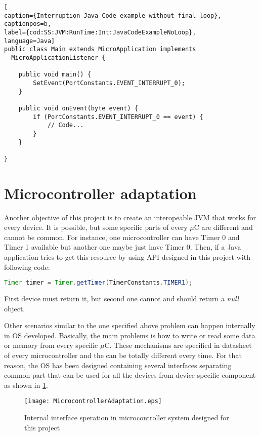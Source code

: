 \medskip
\begin{lstlisting}[
caption={Interruption Java Code example without final loop},
captionpos=b,
label={cod:SS:JVM:RunTime:Int:JavaCodeExampleNoLoop},
language=Java]
public class Main extends MicroApplication implements
  MicroApplicationListener {

    public void main() {
        SetEvent(PortConstants.EVENT_INTERRUPT_0);
    }

    public void onEvent(byte event) {
        if (PortConstants.EVENT_INTERRUPT_0 == event) {
            // Code...
        }
    }

}
\end{lstlisting}
\medskip

\section{Microcontroller adaptation}\label{SS:JVM:Micros}
Another objective of this project is to create an interopeable JVM that works for every device. It is possible, but some specific parts of every $\mu$C are different and cannot be common. For instance, one microcontroller can have Timer 0 and Timer 1 available but another one maybe just have Timer 0. Then, if a Java application tries to get this resource by using API designed in this project with following code:

\medskip
\begin{lstlisting}[language=Java]
Timer timer = Timer.getTimer(TimerConstants.TIMER1);
\end{lstlisting}
\medskip

First device must return it, but second one cannot and should return a \textit{null} object.

Other scenarios similar to the one specified above problem can happen internally in OS developed. Basically, the main problems is how to write or read some data or memory from every specific $\mu$C. These mechanisms are specified in datasheet of every microcontroller and the can be totally different every time. For that reason, the OS has been designed containing several interfaces separating common part that can be used for all the devices from device specific component as shown in \ref{fig:uCIntfs}.

\begin{figure}[H]
\centering
\texttt{[image: MicrocontrollerAdaptation.eps]}
\caption{Internal interface speration in microcontroller system designed for this project}
\label{fig:uCIntfs}
\end{figure}

